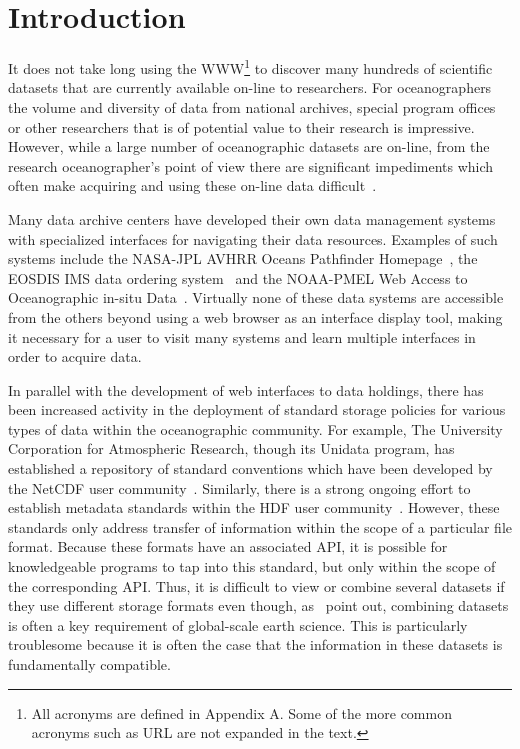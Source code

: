 \documentclass{article}
\begin{document}
\tableofcontents

\section{Introduction}

It does not take long using the \ac{WWW}\footnote{All acronyms are defined in
  Appendix A. Some of the more common acronyms such as URL are not expanded
  in the text.} to discover many hundreds of scientific datasets that are
currently available on-line to researchers.  For oceanographers the volume
and diversity of data from national archives, special program offices or
other researchers that is of potential value to their research is
impressive. However, while a large number of oceanographic datasets are
on-line, from the research oceanographer's point of view there are
significant impediments which often make acquiring and using these on-line
data difficult~\cite{muntz:data}.

Many data archive centers have developed their own data management systems
with specialized interfaces for navigating their data resources. Examples of
such systems include the \acs{NASA}-\acs{JPL} \acs{AVHRR} Oceans Pathfinder
Homepage~\cite{podaac:sst}, the \acs{EOSDIS} \acs{IMS} data ordering
system~\cite{eosdis:ims} and the \acs{NOAA}-\acs{PMEL} Web Access to
Oceanographic in-situ Data~\cite{noaapmel:tao}.  Virtually none of these data
systems are accessible from the others beyond using a web browser as an
interface display tool, making it necessary for a user to visit many systems
and learn multiple interfaces in order to acquire data.

In parallel with the development of web interfaces to data holdings, there
has been increased activity in the deployment of standard storage policies
for various types of data within the oceanographic community. For example,
The University Corporation for Atmospheric Research, though its Unidata
program, has established a repository of standard conventions which have been
developed by the \acs{NetCDF} user community~\cite{netcdf:conventions}.
Similarly, there is a strong ongoing effort to establish metadata standards
within the \acs{HDF} user community~\cite{hdfeos}. However, these standards
only address transfer of information within the scope of a particular file
format.  Because these formats have an associated \ac{API}, it is possible
for knowledgeable programs to tap into this standard, but only within the
scope of the corresponding \ac{API}. Thus, it is difficult to view or combine
several datasets if they use different storage formats even though,
as~ point out, combining datasets is often a key
requirement of global-scale earth science.  This is particularly troublesome
because it is often the case that the information in these datasets
is fundamentally compatible.
\end{document}
